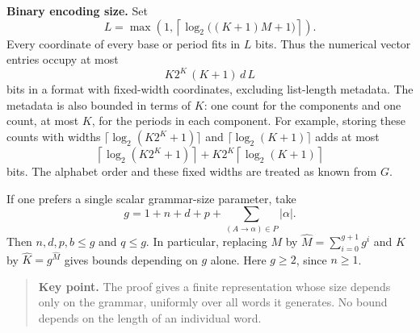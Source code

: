 \documentclass[11pt,a4paper]{article}
\numberwithin{equation}{section}
\theoremstyle{plain}
\theoremstyle{definition}
\theoremstyle{remark}
\newcommand{\key}[1]{\begin{quote}\small\color{ink}\textbf{Key point.} #1\end{quote}}
\begin{document}
\textbf{Binary encoding size.}
Set
\[
L=\max\!\left(1,\left\lceil\log_2\bigl((K+1)M+1\bigr)\right\rceil\right).
\]
Every coordinate of every base or period fits in $L$ bits. Thus the numerical vector entries occupy at most
\begin{equation}\label{eq:bit-bound}
K2^K\,(K+1)\,d\,L
\end{equation}
bits in a format with fixed-width coordinates, excluding list-length metadata. The metadata is also bounded in terms of $K$: one count for the components and one count, at most $K$, for the periods in each component. For example, storing these counts with widths $\lceil\log_2(K2^K+1)\rceil$ and $\lceil\log_2(K+1)\rceil$ adds at most
\[
\left\lceil\log_2(K2^K+1)\right\rceil
+K2^K\left\lceil\log_2(K+1)\right\rceil
\]
bits. The alphabet order and these fixed widths are treated as known from $G$.

If one prefers a single scalar grammar-size parameter, take
\[
g=1+n+d+p+\sum_{(A\to\alpha)\in P}|\alpha|.
\]
Then $n,d,p,b\leq g$ and $q\leq g$. In particular, replacing $M$ by $\widehat M=\sum_{i=0}^{g+1}g^i$ and $K$ by $\widehat K=g^{\widehat M}$ gives bounds depending on $g$ alone. Here $g\geq2$, since $n\geq1$.

\key{The proof gives a finite representation whose size depends only on the grammar, uniformly over all words it generates. No bound depends on the length of an individual word.}
\end{document}
